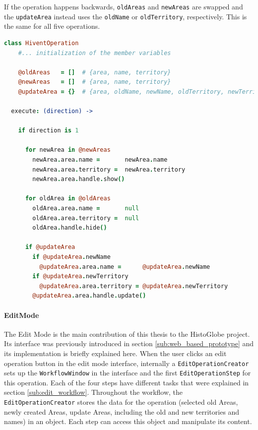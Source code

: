 If the operation happens backwards, \texttt{oldAreas} and \texttt{newAreas} are swapped and the \texttt{updateArea} instead uses the \texttt{oldName} or \texttt{oldTerritory}, respectively. This is the same for all five operations.

\begin{center}
\begin{minipage}[t]{0.9\textwidth}
\begin{lstlisting}[language=coffeescript,
  caption=Execution of an \texttt{HiventOperation} in forward direction,
  label=lst:hivent_operation]
class HiventOperation
    #... initialization of the member variables

    @oldAreas   = []  # {area, name, territory}
    @newAreas   = []  # {area, name, territory}
    @updateArea = {}  # {area, oldName, newName, oldTerritory, newTerritory}

  execute: (direction) ->

    if direction is 1

      for newArea in @newAreas
        newArea.area.name =       newArea.name
        newArea.area.territory =  newArea.territory
        newArea.area.handle.show()

      for oldArea in @oldAreas
        oldArea.area.name =       null
        oldArea.area.territory =  null
        oldArea.handle.hide()

      if @updateArea
        if @updateArea.newName
          @updateArea.area.name =      @updateArea.newName
        if @updateArea.newTerritory
          @updateArea.area.territory = @updateArea.newTerritory
        @updateArea.area.handle.update()
\end{lstlisting}
\end{minipage}
\end{center}


\paragraph{EditMode} %
\label{par:editmode}

The Edit Mode is the main contribution of this thesis to the HistoGlobe project.
Its interface was previously introduced in section \ref{sub:web_based_prototype} and its implementation is briefly explained here. When the user clicks an edit operation button in the edit mode interface, internally a \texttt{EditOperationCreator} sets up the \texttt{WorkflowWindow} in the interface and the first \texttt{EditOperationStep} for this operation. Each of the four steps have different tasks that were explained in section \ref{sub:edit_workflow}. Throughout the workflow, the \texttt{EditOperationCreator} stores the data for the operation (selected old Areas, newly created Areas, update Areas, including the old and new territories and names) in an object. Each step can access this object and manipulate its content.

